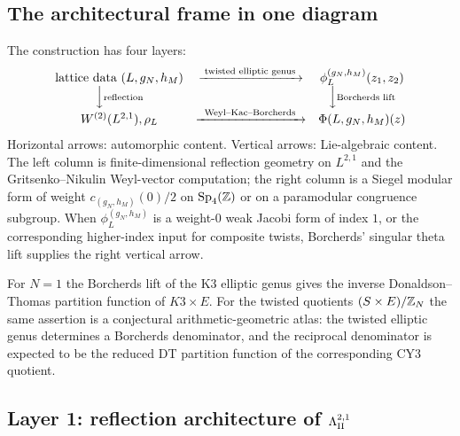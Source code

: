 \subsection{The architectural frame in one diagram}
\label{subsec:atlas-diagram}

The construction has four layers:
\[
\begin{array}{ccc}
\text{lattice data } (L, g_N, h_M) & \xrightarrow{\;\text{twisted elliptic genus}\;} & \phi^{(g_N, h_M)}_L(z_1, z_2) \\
\Big\downarrow\scriptstyle{\text{reflection}} & & \Big\downarrow\scriptstyle{\text{Borcherds lift}} \\
W^{(2)}(L^{2,1}), \rho_L & \xrightarrow{\;\;\text{Weyl--Kac--Borcherds}\;\;} & \Phi(L, g_N, h_M)(z)
\end{array}
\]
Horizontal arrows: automorphic content. Vertical arrows: Lie-algebraic
content. The left column is finite-dimensional reflection geometry on
$L^{2,1}$ and the Gritsenko--Nikulin Weyl-vector computation; the
right column is a Siegel modular form of weight
$c_{(g_N,h_M)}(0)/2$ on $\mathrm{Sp}_4(\mathbb{Z})$ or on a paramodular
congruence subgroup. When $\phi^{(g_N,h_M)}_L$ is a weight-$0$ weak
Jacobi form of index $1$, or the corresponding higher-index input for
composite twists, Borcherds' singular theta lift supplies the right
vertical arrow.

For $N=1$ the Borcherds lift of the K3 elliptic genus gives the inverse
Donaldson--Thomas partition function of $K3\times E$. For the twisted
quotients $(S\times E)/\mathbb{Z}_N$ the same assertion is a conjectural
arithmetic-geometric atlas: the twisted elliptic genus determines a
Borcherds denominator, and the reciprocal denominator is expected to be
the reduced DT partition function of the corresponding CY3 quotient.

\subsection{Layer 1: reflection architecture of $\Lambda^{2,1}_{\mathrm{II}}$}
\label{subsec:refl}

